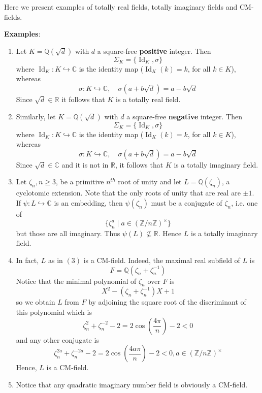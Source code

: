 \documentclass[12pt]{article}
\newcommand{\Ints}{\mathbb{Z}}
\newcommand{\Reals}{\mathbb{R}}
\newcommand{\Complex}{\mathbb{C}}
\newcommand{\Rats}{\mathbb{Q}}
\begin{document}
Here we present examples of totally real fields, totally imaginary
fields and CM-fields.

{\bf Examples}:
\begin{enumerate}
\item Let $K=\Rats(\sqrt{d})$ with $d$ a square-free {\bf
positive} integer. Then
$$\Sigma_K=\{ \operatorname{Id}_K, \sigma\}$$
where $\operatorname{Id}_K\colon K \hookrightarrow \Complex $ is
the identity map ($\operatorname{Id}_K(k)=k$, for all $k\in K$),
whereas
$$\sigma\colon K \hookrightarrow \Complex,\quad
\sigma(a+b\sqrt{d})=a-b\sqrt{d}$$ Since $\sqrt{d}\in \Reals$ it
follows that $K$ is a totally real field.

\item Similarly, let $K=\Rats(\sqrt{d})$ with $d$ a square-free
{\bf negative} integer. Then
$$\Sigma_K=\{ \operatorname{Id}_K, \sigma\}$$
where $\operatorname{Id}_K\colon K \hookrightarrow \Complex $ is
the identity map ($\operatorname{Id}_K(k)=k$, for all $k\in K$),
whereas
$$\sigma\colon K \hookrightarrow \Complex,\quad
\sigma(a+b\sqrt{d})=a-b\sqrt{d}$$ Since $\sqrt{d}\in \Complex$ and
it is not in $\Reals$, it follows that $K$ is a totally imaginary
field.

\item Let $\zeta_n, n\geq 3$, be a primitive $n^{th}$ root of
unity and let $L=\Rats(\zeta_n)$, a cyclotomic extension. Note
that the only roots of unity that are real are $\pm 1$. If
$\psi\colon L \hookrightarrow \Complex $ is an embedding, then
$\psi(\zeta_n)$ must be a conjugate of $\zeta_n$, i.e. one of $$\{
\zeta_n^a \mid a \in (\Ints/n\Ints)^{\times}\}$$ but those are all
imaginary. Thus $\psi(L)\nsubseteq \Reals$. Hence $L$ is a totally
imaginary field.

\item In fact, $L$ as in $(3)$ is a CM-field. Indeed, the maximal
real subfield of $L$ is $$F=\Rats(\zeta_n + \zeta_n^{-1})$$ Notice
that the minimal polynomial of $\zeta_n$ over $F$ is
$$X^2-(\zeta_n+\zeta_n^{-1})X+1$$
so we obtain $L$ from $F$ by adjoining the square root of the
discriminant of this polynomial which is
$$\zeta_n^2+\zeta_n^{-2}-2= 2\cos(\frac{4\pi}{n})-2 < 0$$
and any other conjugate is
$$\zeta_n^{2a}+\zeta_n^{-2a}-2=2\cos(\frac{4a\pi}{n})-2 < 0, a\in
(\Ints/n\Ints)^{\times}$$ Hence, $L$ is a CM-field.

\item Notice that any quadratic imaginary number field is
obviously a CM-field.
\end{enumerate}
\end{document}
